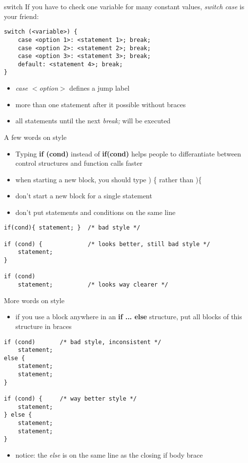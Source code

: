 \begin{frame}[fragile]{switch}
	If you have to check one variable for many constant values, \textit{switch case} is your friend:
	\begin{lstlisting}[numbers=none]
switch (<variable>) {
	case <option 1>: <statement 1>; break;
	case <option 2>: <statement 2>; break;
	case <option 3>: <statement 3>; break;
	default: <statement 4>; break;
}
\end{lstlisting}
	\begin{itemize}
	\item \textit{case $<$option$>$} defines a jump label
	\item more than one statement after it possible without braces
	\item all statements until the next \textit{break;} will be executed
\end{itemize}	 
\end{frame}
\begin{frame}[fragile]{A few words on style}

	\begin{itemize}
		\item Typing \textbf{if (cond)} instead of \textbf{if(cond)} helps people to differantiate between control structures and function calls faster
		\item when starting a new block, you should type ) \{ rather than )\{
		\item don't start a new block for a single statement
		\item don't put statements and conditions on the same line
	\end{itemize}
	\begin{lstlisting}[numbers=none]
if(cond){ statement; }	/* bad style */

if (cond) {				/* looks better, still bad style */
	statement;
}

if (cond)
	statement;			/* looks way clearer */
\end{lstlisting}
\end{frame}
\begin{frame}[fragile]{More words on style}
	\begin{itemize}
		\item if you use a block anywhere in an \textbf{if ... else} structure, put all blocks of this structure in braces
	\end{itemize}
	\begin{lstlisting}[numbers=none]
if (cond)		/* bad style, inconsistent */
	statement;
else {
	statement;
	statement;
}

if (cond) {		/* way better style */
	statement;
} else {
	statement;
	statement;
}
\end{lstlisting}
	\begin{itemize}
		\item notice: the \textit{else} is on the same line as the closing if body brace
	\end{itemize}
\end{frame}

